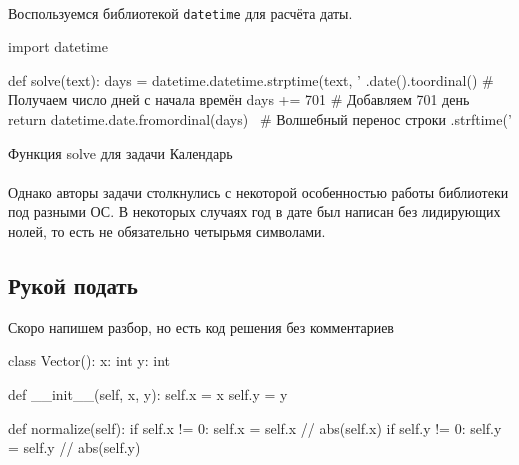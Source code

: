 \documentclass[12pt]{article}
\begin{document}
    \paragraph{}
    Воспользуемся библиотекой \verb|datetime| для расчёта даты.
    \begin{listing}[H]
        \begin{pythoncode}
import datetime

def solve(text):
    days = datetime.datetime.strptime(text, '%
               .date().toordinal()                        # Получаем число дней с начала времён
    days += 701                                           # Добавляем 701 день
    return datetime.date.fromordinal(days) \              # Волшебный перенос строки
        .strftime('%
        \end{pythoncode}
        \label{lst:solve9}
        \caption{Функция solve для задачи Календарь}
    \end{listing}
    \paragraph{}
    Однако авторы задачи столкнулись с некоторой особенностью работы библиотеки под разными ОС.
    В некоторых случаях год в дате был написан без лидирующих нолей, то есть не обязательно четырьмя символами.

    \subsection{Рукой подать}
    Скоро напишем разбор, но есть код решения без комментариев
    \begin{pythoncode}
class Vector():
    x: int
    y: int

    def __init__(self, x, y):
        self.x = x
        self.y = y

    def normalize(self):
        if self.x != 0: self.x = self.x // abs(self.x)
        if self.y != 0: self.y = self.y // abs(self.y)
    \end{pythoncode}
\end{document}
